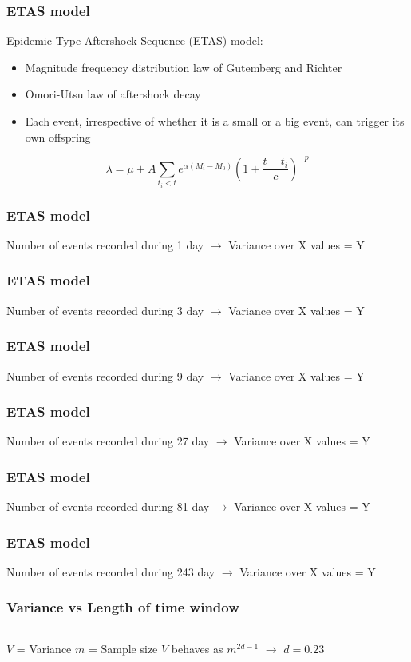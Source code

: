 \documentclass{beamer}
\begin{document}
	\begin{frame}
		\frametitle{ETAS model}
		Epidemic-Type Aftershock Sequence (ETAS) model:
		\begin{itemize}
			\item Magnitude frequency distribution law of Gutemberg and Richter
			\item Omori-Utsu law of aftershock decay
			\item Each event, irrespective of whether it is a small or a big event, can trigger its own offspring
		\end{itemize}
		\begin{equation}
		\lambda = \mu + A \sum_{t_i < t} e^{\alpha \left( M_i - M_0 \right)} \left( 1 + \frac{t - t_i}{c} \right) ^{-p}
		\end{equation}
	\end{frame}

	\begin{frame}
		\frametitle{ETAS model}
		Number of events recorded during 1 day $\rightarrow$ Variance over X values = Y
	\end{frame}

	\begin{frame}
		\frametitle{ETAS model}
		Number of events recorded during 3 day $\rightarrow$ Variance over X values = Y
	\end{frame}

	\begin{frame}
		\frametitle{ETAS model}
		Number of events recorded during 9 day $\rightarrow$ Variance over X values = Y
	\end{frame}

	\begin{frame}
		\frametitle{ETAS model}
		Number of events recorded during 27 day $\rightarrow$ Variance over X values = Y
	\end{frame}

	\begin{frame}
		\frametitle{ETAS model}
		Number of events recorded during 81 day $\rightarrow$ Variance over X values = Y
	\end{frame}

	\begin{frame}
		\frametitle{ETAS model}
		Number of events recorded during 243 day $\rightarrow$ Variance over X values = Y
	\end{frame}

	\begin{frame}
		\frametitle{Variance vs Length of time window}
		\begin{columns}[c]
			\begin{column}{5cm}
				$V$ = Variance
				$m$ = Sample size
				$V$ behaves as $m^{2 d - 1}$
				$\rightarrow$ $d =  0.23$
			\end{column}
			\begin{column}{7cm}
				\begin{center}
				\end{center}
			\end{column}
		\end{columns}
	\end{frame}
\end{document}
